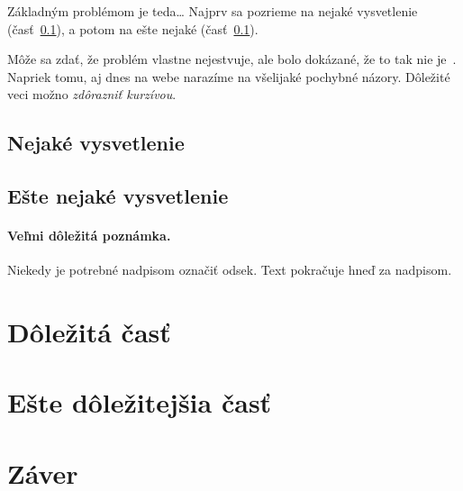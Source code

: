 \documentclass[10pt,twoside,slovak,a4paper]{article}
\begin{document}
Základným problémom je teda\ldots{} Najprv sa pozrieme na nejaké vysvetlenie (časť~\ref{ina:nejake}), a potom na ešte nejaké (časť~\ref{ina:nejake}).

Môže sa zdať, že problém vlastne nejestvuje\cite{Coplien:MPD}, ale bolo dokázané, že to tak nie je~\cite{Czarnecki:Staged, Czarnecki:Progress}. Napriek tomu, aj dnes na webe narazíme na všelijaké pochybné názory\cite{PLP-Framework}. Dôležité veci možno \emph{zdôrazniť kurzívou}.


\subsection{Nejaké vysvetlenie} \label{ina:nejake}


\subsection{Ešte nejaké vysvetlenie} \label{ina:este}

\paragraph{Veľmi dôležitá poznámka.}
Niekedy je potrebné nadpisom označiť odsek. Text pokračuje hneď za nadpisom.



\section{Dôležitá časť} \label{dolezita}




\section{Ešte dôležitejšia časť} \label{dolezitejsia}




\section{Záver} \label{zaver} %






\end{document}
